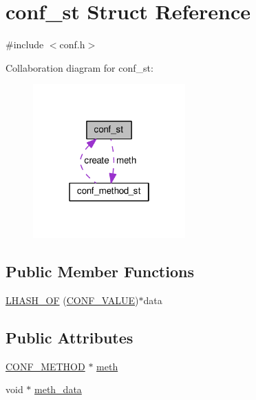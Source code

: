 \hypertarget{structconf__st}{}\section{conf\+\_\+st Struct Reference}
\label{structconf__st}


{\ttfamily \#include $<$conf.\+h$>$}



Collaboration diagram for conf\+\_\+st\+:
\nopagebreak
\begin{figure}[H]
\begin{center}
\leavevmode
\includegraphics[width=166pt]{structconf__st__coll__graph}
\end{center}
\end{figure}
\subsection*{Public Member Functions}
\begin{DoxyCompactItemize}
\item 
\hyperlink{structconf__st_ad6d8a78b1777539fb4b9ff154ec6bd75}{L\+H\+A\+S\+H\+\_\+\+OF} (\hyperlink{struct_c_o_n_f___v_a_l_u_e}{C\+O\+N\+F\+\_\+\+V\+A\+L\+UE})$\ast$data
\end{DoxyCompactItemize}
\subsection*{Public Attributes}
\begin{DoxyCompactItemize}
\item 
\hyperlink{conf_8h_a8e1c42b09eb2fde768c3a90e8338a6ea}{C\+O\+N\+F\+\_\+\+M\+E\+T\+H\+OD} $\ast$ \hyperlink{structconf__st_adfd637f9baf90803bf025f954be7c144}{meth}
\item 
void $\ast$ \hyperlink{structconf__st_aecc251d785e63628b7ad0f70fa9b6122}{meth\+\_\+data}
\end{DoxyCompactItemize}


